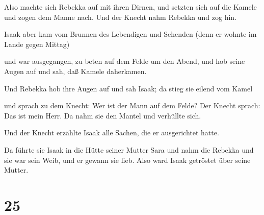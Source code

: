  Also machte sich Rebekka auf mit ihren Dirnen, und setzten
sich auf die Kamele und zogen dem Manne nach. Und der Knecht nahm
Rebekka und zog hin.

 Isaak aber kam vom Brunnen des Lebendigen und Sehenden
(denn er wohnte im Lande gegen Mittag)

 und war ausgegangen, zu beten auf dem Felde um den Abend,
und hob seine Augen auf und sah, daß Kamele daherkamen.

 Und Rebekka hob ihre Augen auf und sah Isaak; da stieg sie
eilend vom Kamel

 und sprach zu dem Knecht: Wer ist der Mann auf dem Felde?
Der Knecht sprach: Das ist mein Herr. Da nahm sie den Mantel und
verhüllte sich.

 Und der Knecht erzählte Isaak alle Sachen, die er
ausgerichtet hatte.

 Da führte sie Isaak in die Hütte seiner Mutter Sara und
nahm die Rebekka und sie war sein Weib, und er gewann sie lieb. Also
ward Isaak getröstet über seine Mutter.

\hypertarget{section-24}{%
\section{25}\label{section-24}}


